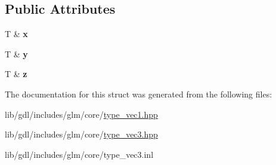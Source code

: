 \subsection*{Public Attributes}
\begin{DoxyCompactItemize}
\item 
\hypertarget{structglm_1_1detail_1_1tref3_a3f14a729db2070ddc283cb51a2f8b356}{}T \& {\bfseries x}\label{structglm_1_1detail_1_1tref3_a3f14a729db2070ddc283cb51a2f8b356}

\item 
\hypertarget{structglm_1_1detail_1_1tref3_a285fa0ec7ea9860e3f0a874214099515}{}T \& {\bfseries y}\label{structglm_1_1detail_1_1tref3_a285fa0ec7ea9860e3f0a874214099515}

\item 
\hypertarget{structglm_1_1detail_1_1tref3_ac35736fe6e6e035b8c0fcb8933de3b3c}{}T \& {\bfseries z}\label{structglm_1_1detail_1_1tref3_ac35736fe6e6e035b8c0fcb8933de3b3c}

\end{DoxyCompactItemize}


The documentation for this struct was generated from the following files\+:\begin{DoxyCompactItemize}
\item 
lib/gdl/includes/glm/core/\hyperlink{type__vec1_8hpp}{type\+\_\+vec1.\+hpp}\item 
lib/gdl/includes/glm/core/\hyperlink{type__vec3_8hpp}{type\+\_\+vec3.\+hpp}\item 
lib/gdl/includes/glm/core/type\+\_\+vec3.\+inl\end{DoxyCompactItemize}

